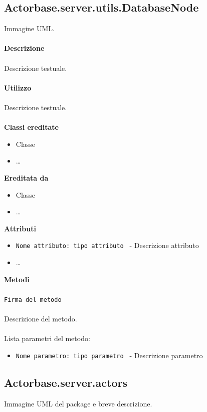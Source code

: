 \documentclass[a4paper]{article}
\begin{document}
	\subsection{Actorbase.server.utils.DatabaseNode}
		Immagine UML.
		\\ \\
		\textbf{Descrizione}
			\\ \\
			Descrizione testuale.
			\\ \\
		\textbf{Utilizzo}
			\\ \\
			Descrizione testuale.
			\\ \\
		\textbf{Classi ereditate}
			\begin{itemize}
				\item Classe
				\item \dots
			\end{itemize}
		\textbf{Ereditata da}
			\begin{itemize}
				\item Classe
				\item \dots
			\end{itemize}
		\textbf{Attributi}
			\begin{itemize}
				\item \texttt{Nome attributo: tipo attributo } - Descrizione attributo
				\item \dots
			\end{itemize}
		\textbf{Metodi}
			\\ \\
			\texttt{Firma del metodo}
			\\ \\
			Descrizione del metodo.
			\\ \\
			Lista parametri del metodo:
			\begin{itemize}
				\item \texttt{Nome parametro: tipo parametro } - Descrizione parametro
			\end{itemize}
			
	\subsection{Actorbase.server.actors}
		Immagine UML del package e breve descrizione.
		
\end{document}

